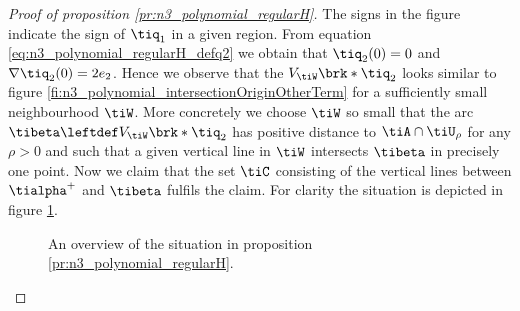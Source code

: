 \begin{proof}[Proof of proposition \ref{pr:n3_polynomial_regularH}]
  The signs in the figure indicate the sign of $\tiq_1$ in a given region.
  From equation \eqref{eq:n3_polynomial_regularH_defq2}
  we obtain that $\tiq_2(0)=0$ and $\nabla \tiq_2(0)=2e_2$.
  Hence we observe that the $V_{\tiW}\brk*{\tiq_2}$ looks similar to figure \ref{fi:n3_polynomial_intersectionOriginOtherTerm}
  for a sufficiently small neighbourhood $\tiW$.
  More concretely we choose $\tiW$ so small that the arc $\tibeta\leftdef V_{\tiW}\brk*{\tiq_2}$ has positive distance to $\tiA\cap \tiU_\rho$ for
  any $\rho>0$ and such that a given vertical line in $\tiW$ intersects $\tibeta$ in precisely one point.
  Now we claim that the set $\tiC$ consisting of the vertical lines between $\tialpha^+$
  and $\tibeta$ fulfils the claim. For clarity the situation is depicted in figure \ref{fi:n3_polynomial_intersectionOrigin_overview}.
  \begin{figure}
    \centering
    
    \caption{An overview of the situation in proposition \ref{pr:n3_polynomial_regularH}.}
    \label{fi:n3_polynomial_intersectionOrigin_overview}
  \end{figure}


\end{proof}
